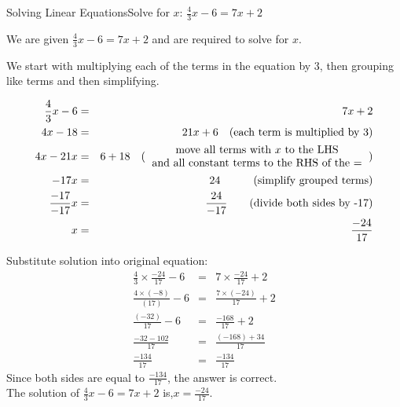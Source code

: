 \documentclass[10pt,a4paper,titlepage,twoside,openright]{report}
\begin{document}
\begin{wex}{Solving Linear Equations}{Solve for $x$: $\frac{4}{3}x-6=7x+2$}{
We are given $\frac{4}{3}x-6=7x+2$ and are required to solve for $x$.

We start with multiplying each of the terms in the equation by $3$, then
grouping like terms and then simplifying.

\begin{eqnarray*}
\frac{4}{3}x-6&=&7x+2\\
4x-18&=&21x+6\quad\mbox{(each term is multiplied by 3)}\\
4x-21x&=&6+18\quad\mbox{(\begin{tabular}{c}move all terms with $x$ to the LHS \\and all constant
terms to the RHS of the =\end{tabular})}\\
-17x&=&24\quad\quad\quad\mbox{(simplify grouped terms)}\\
\frac{-17}{-17}x&=&\frac{24}{-17}\quad\quad\mbox{(divide both sides by -17)}\\
x&=&\frac{-24}{17}
\end{eqnarray*}

Substitute solution into original equation:
\begin{eqnarray*}
\frac{4}{3}\times\frac{-24}{17}-6&=&7\times\frac{-24}{17}+2\\
\frac{4\times (-8)}{(17)}-6&=&\frac{7\times(-24)}{17}+2\\
\frac{(-32)}{17}-6&=&\frac{-168}{17}+2\\
\frac{-32-102}{17}&=&\frac{(-168)+34}{17}\\
\frac{-134}{17}&=&\frac{-134}{17}
\end{eqnarray*}
Since both sides are equal to $\frac{-134}{17}$, the answer is correct.\\


The solution of $\frac{4}{3}x-6=7x+2$ is,\quad $x=\frac{-24}{17}$.}
\end{wex}
\end{document}
